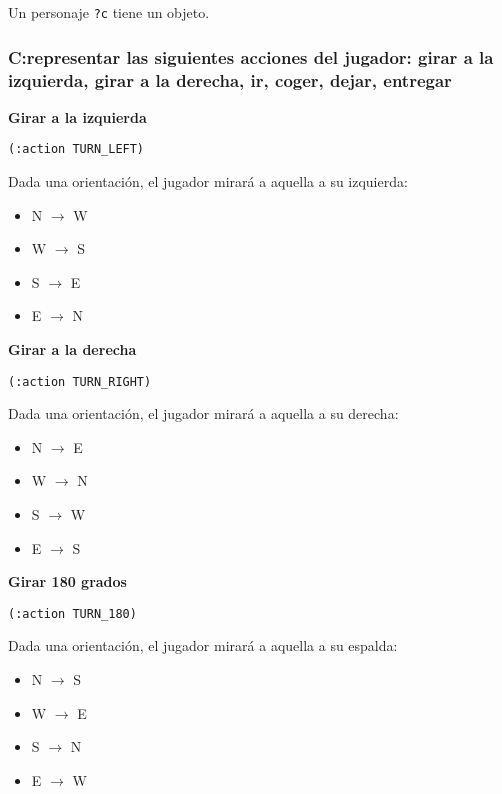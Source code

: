 \documentclass[11pt,a4paper]{article}
\begin{document}
\smallskip

Un personaje \texttt{?c} tiene un objeto. 

\newpage

\subsubsection*{C:representar las siguientes acciones del jugador: girar a la izquierda, girar a la derecha, ir, coger, dejar, entregar}

\large{\textbf{Girar a la izquierda}}

\texttt{(:action TURN\_LEFT)}

\smallskip

Dada una orientación, el jugador mirará a aquella a su izquierda:

\begin{itemize}
\item N $\rightarrow$ W
\item W $\rightarrow$ S
\item S $\rightarrow$ E
\item E $\rightarrow$ N
\end{itemize}

\medskip

\large{\textbf{Girar a la derecha}}

\texttt{(:action TURN\_RIGHT)}

\smallskip

Dada una orientación, el jugador mirará a aquella a su derecha:

\begin{itemize}
\item N $\rightarrow$ E
\item W $\rightarrow$ N
\item S $\rightarrow$ W
\item E $\rightarrow$ S
\end{itemize}

\medskip

\large{\textbf{Girar 180 grados}}

\texttt{(:action TURN\_180)}

\smallskip

Dada una orientación, el jugador mirará a aquella a su espalda:

\begin{itemize}
\item N $\rightarrow$ S
\item W $\rightarrow$ E
\item S $\rightarrow$ N
\item E $\rightarrow$ W
\end{itemize}
\end{document}
